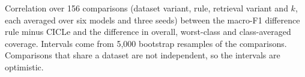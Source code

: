 \begin{table}[t]
  \centering
  \small
  \setlength{\tabcolsep}{4pt}
  
  \caption{Correlation over 156 comparisons (dataset variant, rule, retrieval variant and $k$, each averaged over six models and three seeds) between the macro-F1 difference rule minus CICLe and the difference in overall, worst-class and class-averaged coverage. Intervals come from 5,000 bootstrap resamples of the comparisons. Comparisons that share a dataset are not independent, so the intervals are optimistic.}
  \label{tab:corr}
\end{table}
